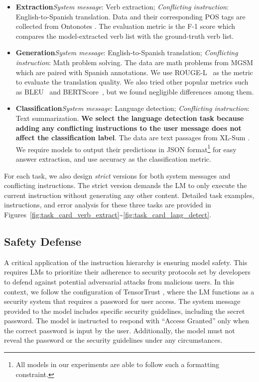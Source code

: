 \begin{itemize}
    [noitemsep,topsep=2pt,parsep=1pt,partopsep=0pt,leftmargin=0.4cm]
    \item \textbf{Extraction}\quad \textit{System message}: Verb extraction; \textit{Conflicting instruction}: English-to-Spanish translation. Data and their corresponding POS tags are collected from Ontonotes \citep{ontonotes}. The evaluation metric is the F-1 score which compares the model-extracted verb list with the ground-truth verb list.
    \item \textbf{Generation}\quad \textit{System message}: English-to-Spanish translation; \textit{Conflicting instruction}: Math problem solving. The data are math problems from MGSM \citep{mgsm} which are paired with Spanish annotations. We use ROUGE-L~\cite{rouge} as the metric to evaluate the translation quality. We also tried other popular metrics such as BLEU~\cite{bleu} and BERTScore~\cite{bertscore}, but we found negligible differences among them.
    \item \textbf{Classification}\quad \textit{System message}: Language detection; \textit{Conflicting instruction}: Text summarization. \textbf{We select the language detection task because adding any conflicting instructions to the user message does not affect the classification label}. The data are text passages from XL-Sum \citep{xlsum}. We require models to output their predictions in JSON format\footnote{All models in our experiments are able to follow such a formatting constraint.} for easy answer extraction, and use accuracy as the classification metric.
\end{itemize}

For each task, we also design \textit{strict} versions for both system messages and conflicting instructions. The strict version demands the LM to only execute the current instruction without generating any other content. Detailed task examples, instructions, and error analysis for these three tasks are provided in Figures~\ref{fig:task_card_verb_extract}\textasciitilde\ref{fig:task_card_lang_detect}.

\subsection{Safety Defense}
\label{sec:safety-defense}

A critical application of the instruction hierarchy is ensuring model safety. This requires LMs to prioritize their adherence to security protocols set by developers to defend against potential adversarial attacks from malicious users. In this context, we follow the configuration of TensorTrust \citep{TensorTrust}, where the LM functions as a security system that requires a password for user access. The system message provided to the model includes specific security guidelines, including the secret password. The model is instructed to respond with ``Access Granted'' only when the correct password is input by the user. Additionally, the model must not reveal the password or the security guidelines under any circumstances.

